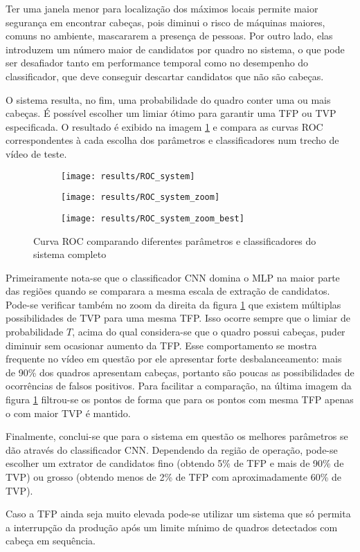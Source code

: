 Ter uma janela menor para localização dos máximos locais permite maior segurança em encontrar cabeças, pois diminui o risco de máquinas maiores, comuns no ambiente, mascararem a presença de pessoas. Por outro lado, elas introduzem um número maior de candidatos por quadro no sistema, o que pode ser desafiador tanto em performance temporal como no desempenho do classificador, que deve conseguir descartar candidatos que não são cabeças.

O sistema resulta, no fim, uma probabilidade do quadro conter uma ou mais cabeças. É possível escolher um limiar ótimo para garantir uma TFP ou TVP especificada. O resultado é exibido na imagem \ref{fig:ROC-system} e compara as curvas ROC correspondentes à cada escolha dos parâmetros e classificadores num trecho de vídeo de teste.

\begin{figure}
\centering
\begin{subfigure}{0.5\textwidth}
  \centering
  \texttt{[image: results/ROC\_system]}
\end{subfigure}%
\begin{subfigure}{.5\textwidth}
  \centering
  \texttt{[image: results/ROC\_system\_zoom]}
\end{subfigure}
\begin{subfigure}{.5\textwidth}
  \centering
  \texttt{[image: results/ROC\_system\_zoom\_best]}
\end{subfigure}
\caption{Curva ROC comparando diferentes parâmetros e classificadores do sistema completo}
\label{fig:ROC-system}
\end{figure}

Primeiramente nota-se que o classificador CNN domina o MLP na maior parte das regiões quando se comparara a mesma escala de extração de candidatos. Pode-se verificar também no zoom da direita da figura \ref{fig:ROC-system} que existem múltiplas possibilidades de TVP para uma mesma TFP. Isso ocorre sempre que o limiar de probabilidade $T$, acima do qual considera-se que o quadro possui cabeças, puder diminuir sem ocasionar aumento da TFP. Esse comportamento se mostra frequente no vídeo em questão por ele apresentar forte desbalanceamento: mais de 90\% dos quadros apresentam cabeças, portanto são poucas as possibilidades de ocorrências de falsos positivos. Para facilitar a comparação, na última imagem da figura \ref{fig:ROC-system} filtrou-se os pontos de forma que para os pontos com mesma TFP apenas o com maior TVP é mantido.

Finalmente, conclui-se que para o sistema em questão os melhores parâmetros se dão através do classificador CNN. Dependendo da região de operação, pode-se escolher um extrator de candidatos fino (obtendo 5\% de TFP e mais de 90\% de TVP) ou grosso (obtendo menos de 2\% de TFP com aproximadamente 60\% de TVP). 

Caso a TFP ainda seja muito elevada pode-se utilizar um sistema que só permita a interrupção da produção após um limite mínimo de quadros detectados com cabeça em sequência.


